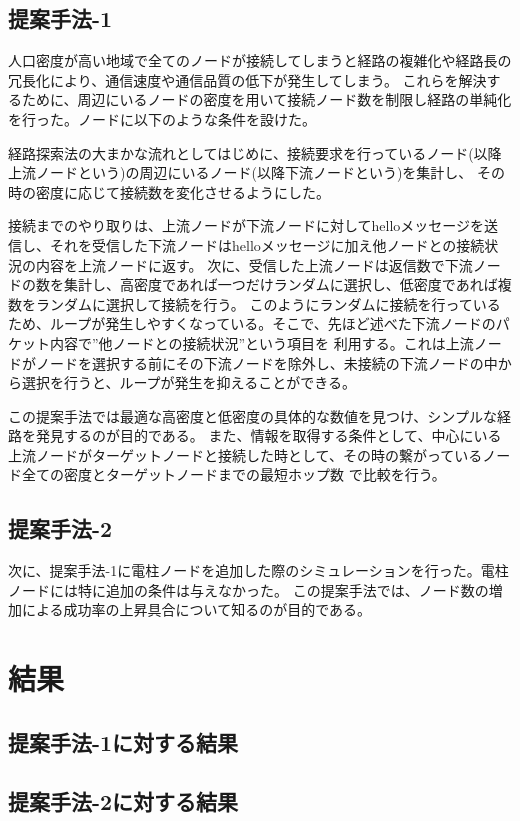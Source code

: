 \documentclass[a4paper, 9pt]{ltjsarticle}
\begin{document}
\subsection{提案手法-1}
人口密度が高い地域で全てのノードが接続してしまうと経路の複雑化や経路長の冗長化により、通信速度や通信品質の低下が発生してしまう。
これらを解決するために、周辺にいるノードの密度を用いて接続ノード数を制限し経路の単純化を行った。ノードに以下のような条件を設けた。\par
経路探索法の大まかな流れとしてはじめに、接続要求を行っているノード(以降上流ノードという)の周辺にいるノード(以降下流ノードという)を集計し、
その時の密度に応じて接続数を変化させるようにした。\par
接続までのやり取りは、上流ノードが下流ノードに対してhelloメッセージを送信し、それを受信した下流ノードはhelloメッセージに加え他ノードとの接続状況の内容を上流ノードに返す。
次に、受信した上流ノードは返信数で下流ノードの数を集計し、高密度であれば一つだけランダムに選択し、低密度であれば複数をランダムに選択して接続を行う。
このようにランダムに接続を行っているため、ループが発生しやすくなっている。そこで、先ほど述べた下流ノードのパケット内容で”他ノードとの接続状況”という項目を
利用する。これは上流ノードがノードを選択する前にその下流ノードを除外し、未接続の下流ノードの中から選択を行うと、ループが発生を抑えることができる。\par
この提案手法では最適な高密度と低密度の具体的な数値を見つけ、シンプルな経路を発見するのが目的である。
また、情報を取得する条件として、中心にいる上流ノードがターゲットノードと接続した時として、その時の繋がっているノード全ての密度とターゲットノードまでの最短ホップ数
で比較を行う。

\subsection{提案手法-2}
次に、提案手法-1に電柱ノードを追加した際のシミュレーションを行った。電柱ノードには特に追加の条件は与えなかった。
この提案手法では、ノード数の増加による成功率の上昇具合について知るのが目的である。


\section{結果}
\subsection{提案手法-1に対する結果}
\subsection{提案手法-2に対する結果}
\end{document}
